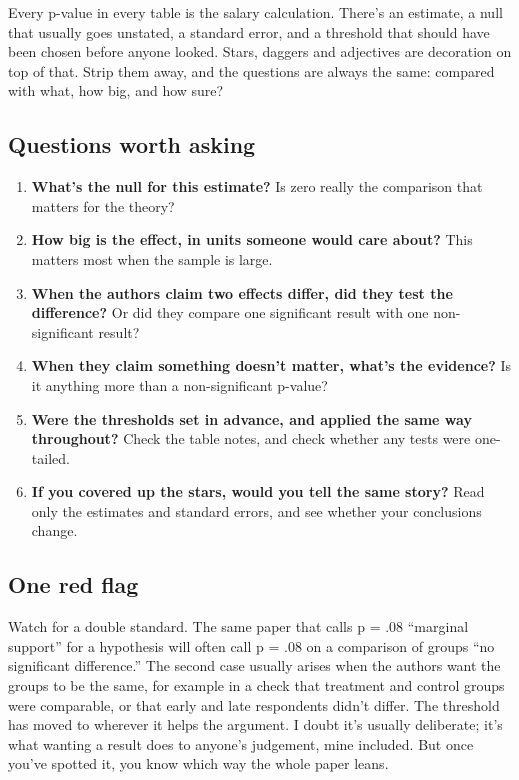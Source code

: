 \documentclass[
]{book}
\providecommand{\tightlist}{%
  \setlength{\itemsep}{0pt}\setlength{\parskip}{0pt}}
\begin{document}
Every p-value in every table is the salary calculation. There's an estimate, a null that usually goes unstated, a standard error, and a threshold that should have been chosen before anyone looked. Stars, daggers and adjectives are decoration on top of that. Strip them away, and the questions are always the same: compared with what, how big, and how sure?

\subsection{Questions worth asking}\label{questions-worth-asking-7}

\begin{enumerate}
\def\labelenumi{\arabic{enumi}.}
\tightlist
\item
  \textbf{What's the null for this estimate?} Is zero really the comparison that matters for the theory?
\item
  \textbf{How big is the effect, in units someone would care about?} This matters most when the sample is large.
\item
  \textbf{When the authors claim two effects differ, did they test the difference?} Or did they compare one significant result with one non-significant result?
\item
  \textbf{When they claim something doesn't matter, what's the evidence?} Is it anything more than a non-significant p-value?
\item
  \textbf{Were the thresholds set in advance, and applied the same way throughout?} Check the table notes, and check whether any tests were one-tailed.
\item
  \textbf{If you covered up the stars, would you tell the same story?} Read only the estimates and standard errors, and see whether your conclusions change.
\end{enumerate}

\subsection{One red flag}\label{one-red-flag-7}

Watch for a double standard. The same paper that calls p = .08 ``marginal support'' for a hypothesis will often call p = .08 on a comparison of groups ``no significant difference.'' The second case usually arises when the authors want the groups to be the same, for example in a check that treatment and control groups were comparable, or that early and late respondents didn't differ. The threshold has moved to wherever it helps the argument. I doubt it's usually deliberate; it's what wanting a result does to anyone's judgement, mine included. But once you've spotted it, you know which way the whole paper leans.
\end{document}
